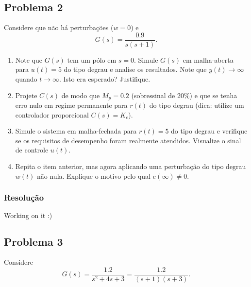\documentclass[
]{book}
\providecommand{\tightlist}{%
  \setlength{\itemsep}{0pt}\setlength{\parskip}{0pt}}
\begin{document}
\hypertarget{problema-2}{%
\subsection*{Problema 2}\label{problema-2}}

Considere que não há perturbações (\(w=0\)) e
\[
G(s) = \frac{0.9}{s(s+1)}.
\]

\begin{enumerate}
\def\labelenumi{(\alph{enumi})}
\tightlist
\item
  Note que \(G(s)\) tem um pólo em \(s=0\). Simule \(G(s)\) em malha-aberta para \(u(t) = 5\) do tipo degrau e analise os resultados. Note que \(y(t) \to \infty\) quando \(t \to \infty\). Isto era esperado? Justifique.
\item
  Projete \(C(s)\) de modo que \(M_p = 0.2\) (sobressinal de \(20\%\)) e que se tenha erro nulo em regime permanente para \(r(t)\) do tipo degrau (dica: utilize um controlador proporcional \(C(s) = K_c\)).
\item
  Simule o sistema em malha-fechada para \(r(t) = 5\) do tipo degrau e verifique se os requisitos de desempenho foram realmente atendidos. Visualize o sinal de controle \(u(t)\).
\item
  Repita o item anterior, mas agora aplicando uma perturbação do tipo degrau \(w(t)\) não nula. Explique o motivo pelo qual \(e(\infty) \neq 0\).
\end{enumerate}

\hypertarget{resoluuxe7uxe3o-1}{%
\subsubsection*{Resolução}\label{resoluuxe7uxe3o-1}}

Working on it :)

\hypertarget{problema-3}{%
\subsection*{Problema 3}\label{problema-3}}

Considere
\[
G(s) = \frac{1.2}{s^2+4s+3} = \frac{1.2}{(s+1)(s+3)}.
\]
\end{document}
